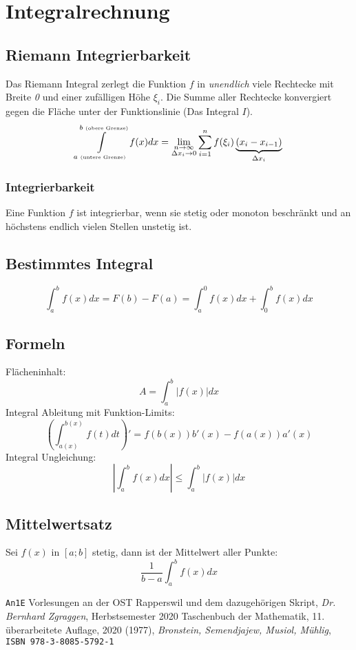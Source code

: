 \section{Integralrechnung}

\subsection{Riemann Integrierbarkeit}
Das Riemann Integral zerlegt die Funktion $f$ in \textit{unendlich} viele Rechtecke mit Breite \textit{0} und einer zufälligen Höhe $\xi_i$. Die Summe aller Rechtecke konvergiert gegen die Fläche unter der Funktionslinie (Das Integral $I$).
\[
\int\limits_{a \text{ \tiny(untere Grenze)}}^{b \text{ \tiny(obere Grenze)}}f(x)dx = \lim_{\substack{n\to\infty\\\Delta x_i\to 0}} \sum\limits_{i = 1}^{n}f(\xi_i)\underbrace{(x_i - x_{i-1})}_{\Delta x_i}
\]

\subsubsection{Integrierbarkeit}
Eine Funktion $f$ ist integrierbar, wenn sie stetig oder monoton beschränkt und an höchstens endlich vielen Stellen unstetig ist.

\subsection{Bestimmtes Integral}
\[\int_{a}^{b}f(x)dx = F(b) - F(a) = \int_{a}^{0}f(x)dx + \int_{0}^{b}f(x)dx\]

\subsection{Formeln}
\noindent Flächeninhalt: \[A = \int_{a}^{b}\left|f(x)\right|dx\]
\noindent Integral Ableitung mit Funktion-Limits: \[\left(\int_{a(x)}^{b(x)}f(t)dt\right)' = f(b(x))b'(x) - f(a(x))a'(x)\]
\noindent Integral Ungleichung:
\[\left|\int_{a}^{b}f(x)dx\right| \leq \int_{a}^{b}\left|f(x)\right|dx\]

\subsection{Mittelwertsatz}
Sei $f(x)$ in $[a;b]$ stetig, dann ist der Mittelwert aller Punkte:
\[\frac{1}{b-a}\int_{a}^{b}f(x)dx\]


\begin{thebibliography}{1}
	\texttt{An1E} Vorlesungen an der OST Rapperswil und dem dazugehörigen Skript,
	\textit{Dr. Bernhard Zgraggen}, Herbstsemester 2020
	Taschenbuch der Mathematik,
	11. \"uberarbeitete Auflage, 2020 (1977),
	\textit{Bronstein, Semendjajew, Musiol, M\"uhlig}, 
	\texttt{ISBN 978-3-8085-5792-1}
\end{thebibliography}

